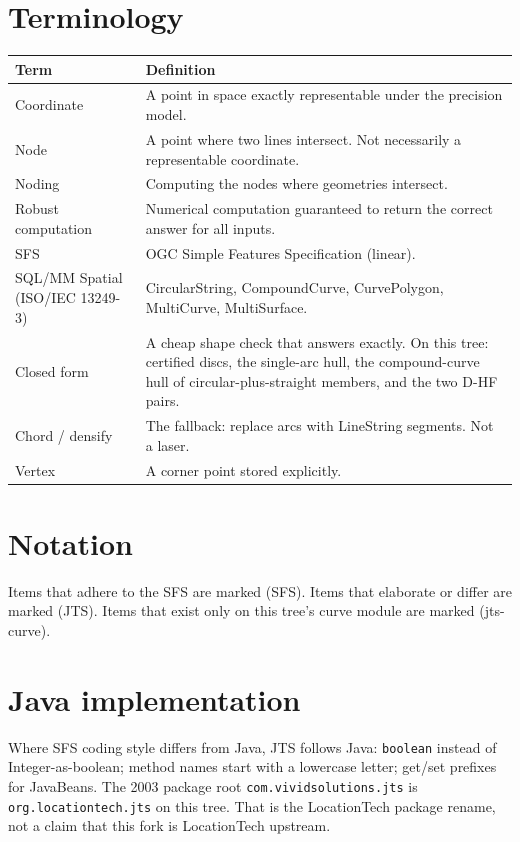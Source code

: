 \documentclass[11pt]{article}
\begin{document}
\section{Terminology}
\begin{center}
\begin{tabular}{>{\raggedright\arraybackslash}p{3.4cm}p{9.8cm}}
  \toprule
  \textbf{Term} & \textbf{Definition} \\
  \midrule
  Coordinate     & A point in space exactly representable under the
                   precision model. \\
  Node           & A point where two lines intersect. Not necessarily
                   a representable coordinate. \\
  Noding         & Computing the nodes where geometries intersect. \\
  Robust computation & Numerical computation guaranteed to return
                   the correct answer for all inputs. \\
  SFS            & OGC Simple Features Specification (linear). \\
  SQL/MM Spatial (ISO/IEC 13249-3) & CircularString, CompoundCurve,
                   CurvePolygon, MultiCurve, MultiSurface. \\
  Closed form    & A cheap shape check that answers exactly. On this
                   tree: certified discs, the single-arc hull, the
                   compound-curve hull of circular-plus-straight
                   members, and the two D-HF pairs. \\
  Chord / densify & The fallback: replace arcs with LineString
                   segments. Not a laser. \\
  Vertex         & A corner point stored explicitly. \\
  \bottomrule
\end{tabular}
\end{center}

\section{Notation}
Items that adhere to the SFS are marked (SFS). Items that elaborate
or differ are marked (JTS). Items that exist only on this tree's
curve module are marked (jts-curve).

\section{Java implementation}
Where SFS coding style differs from Java, JTS follows Java:
\texttt{boolean} instead of Integer-as-boolean; method names start
with a lowercase letter; get/set prefixes for JavaBeans. The 2003
package root \texttt{com.vividsolutions.jts} is
\texttt{org.locationtech.jts} on this tree. That is the LocationTech
package rename, not a claim that this fork is LocationTech upstream.
\end{document}

